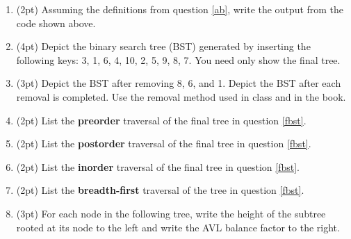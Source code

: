 \documentclass{article}
\newcommand*{\pts}[1]{\addtocounter{points}{#1}(#1pt)}
\begin{document}
\begin{spacing}{1.4}
\begin{enumerate}[leftmargin=*]
\item \pts{2} Assuming the definitions from question \ref{ab}, write
  the output from the code shown above.

\vspace{2cm}

\item \pts{4} Depict the binary search tree (BST) generated by
inserting the following keys: 3, 1, 6, 4, 10, 2, 5, 9, 8, 7. You need
only show the final tree.

\vspace{6cm}

\item\label{fbst} \pts{3} Depict the BST after removing 8, 6, and
1. Depict the BST after each removal is completed. Use the removal
method used in class and in the book.

\vspace{12cm}

\item \pts{2} List the \textbf{preorder} traversal of the final tree
in question \ref{fbst}.

\vspace{2cm}

\item \pts{2} List the \textbf{postorder} traversal of the final tree
in question \ref{fbst}.

\vspace{2cm}

\item \pts{2} List the \textbf{inorder} traversal of the final tree in
question \ref{fbst}.

\vspace{2cm}

\item \pts{2} List the \textbf{breadth-first} traversal of the tree in
question \ref{fbst}.

\vspace{2cm}

\item\label{tree} \pts{3} For each node in the following tree,
  write the height of the subtree rooted at its node to the left and
  write the AVL balance factor to the right.

\begin{center}



\resizebox{12.0cm}{!}{%
\begin{tikzpicture}[level/.style={sibling distance = 16cm/(2^#1),
  level distance = 2cm}] 


\end{tikzpicture}}
\end{center}
\end{enumerate}
\end{spacing}
\end{document}
